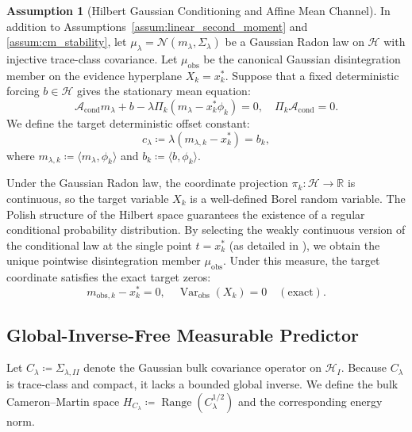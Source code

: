 \documentclass[11pt]{amsart}
\theoremstyle{plain}
\theoremstyle{definition}
\newtheorem{assumption}[theorem]{Assumption}
\theoremstyle{remark}
\newcommand{\cond}{\operatorname{cond}}
\newcommand{\Var}{\operatorname{Var}}
\begin{document}
\begin{assumption}[Hilbert Gaussian Conditioning and Affine Mean Channel]
  \label{assum:gaussian_clamp}
  In addition to Assumptions~\ref{assum:linear_second_moment} and \ref{assum:cm_stability}, let $\mu_\lambda = \mathcal{N}(m_\lambda, \Sigma_\lambda)$ be a Gaussian Radon law on $\mathcal{H}$ with injective trace-class covariance. Let $\mu_{\mathrm{obs}}$ be the canonical Gaussian disintegration member on the evidence hyperplane $X_k = x_k^*$. Suppose that a fixed deterministic forcing $b \in \mathcal{H}$ gives the stationary mean equation:
  \begin{equation}
    \mathcal{A}_{\cond} m_\lambda + b - \lambda \Pi_k (m_\lambda - x_k^* \phi_k) = 0, \quad \Pi_k \mathcal{A}_{\cond} = 0.
  \end{equation}
  We define the target deterministic offset constant:
  \begin{equation}
    c_\lambda \coloneqq \lambda(m_{\lambda,k} - x_k^*) = b_k,
  \end{equation}
  where $m_{\lambda,k} \coloneqq \langle m_\lambda, \phi_k \rangle$ and $b_k \coloneqq \langle b, \phi_k \rangle$.
\end{assumption}

Under the Gaussian Radon law, the coordinate projection $\pi_k: \mathcal{H} \to \mathbb{R}$ is continuous, so the target variable $X_k$ is a well-defined Borel random variable. The Polish structure of the Hilbert space guarantees the existence of a regular conditional probability distribution. 
By selecting the weakly continuous version of the conditional law at the single point $t = x_k^*$ (as detailed in ), we obtain the unique pointwise disintegration member $\mu_{\mathrm{obs}}$. Under this measure, the target coordinate satisfies the exact target zeros:
\begin{equation}
  \label{eq:exact_target_zeros}
  m_{\text{obs},k} - x_k^* = 0, \quad \Var_{\text{obs}}(X_k) = 0 \quad (\text{exact}).
\end{equation}

\subsection{Global-Inverse-Free Measurable Predictor}
\label{sec:gaussian:predictor}

Let $C_\lambda \coloneqq \Sigma_{\lambda,II}$ denote the Gaussian bulk covariance operator on $\mathcal{H}_I$. Because $C_\lambda$ is trace-class and compact, it lacks a bounded global inverse. We define the bulk Cameron--Martin space $H_{C_\lambda} \coloneqq \operatorname{Range}(C_\lambda^{1/2})$ and the corresponding energy norm.
\end{document}
